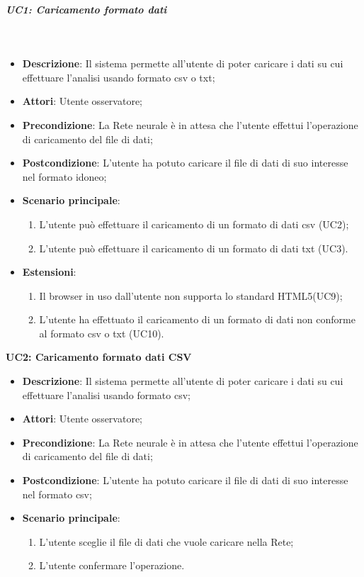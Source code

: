 \subparagraph{UC1: Caricamento formato dati}\mbox{}\\
\label{UC1: Caricamento formato dati}
\noindent
\begin{itemize}
\item \textbf{Descrizione}: Il sistema permette all'utente di poter caricare i dati su cui effettuare l'analisi usando formato csv o txt;
\item \textbf{Attori}: Utente osservatore;
\item \textbf{Precondizione}: La Rete neurale \`e in attesa che l'utente effettui l'operazione di caricamento del file di dati;
\item \textbf{Postcondizione}: L'utente ha potuto caricare il file di dati di suo interesse nel formato idoneo;
\item \textbf{Scenario principale}:
\begin{enumerate}
\item L'utente pu\`o effettuare il caricamento di un formato di dati csv (UC2);
\item L'utente pu\`o effettuare il caricamento di un formato di dati txt (UC3).
\end{enumerate}
\item \textbf{Estensioni}:
\begin{enumerate}
\item Il browser in uso dall'utente non supporta lo standard HTML5(UC9);
\item L'utente ha effettuato il caricamento di un formato di dati non conforme al formato csv o txt (UC10).
\end{enumerate}
\end{itemize}


\textbf{UC2: Caricamento formato dati CSV}\mbox{}
\label{UC2: Caricamento formato dati CSV}
\begin{itemize}
\item \textbf{Descrizione}: Il sistema permette all'utente di poter caricare i dati su cui effettuare l'analisi usando formato csv;
\item \textbf{Attori}: Utente osservatore;
\item \textbf{Precondizione}: La Rete neurale \`e in attesa che l'utente effettui l'operazione di caricamento del file di dati;
\item \textbf{Postcondizione}: L'utente ha potuto caricare il file di dati di suo interesse nel formato csv;
\item \textbf{Scenario principale}:
\begin{enumerate}
\item L'utente sceglie il file di dati che vuole caricare nella Rete;
\item L'utente confermare l'operazione.
\end{enumerate}
\end{itemize}


